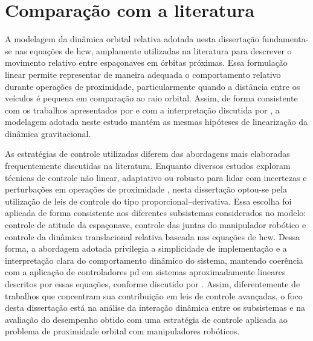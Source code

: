 \section{Comparação com a literatura}
\label{sec_comparacao_literatura}

A modelagem da dinâmica orbital relativa adotada nesta dissertação fundamenta-se nas equações de \gls{hcw}, amplamente utilizadas na literatura para descrever o movimento relativo entre espaçonaves em órbitas próximas.
Essa formulação linear permite representar de maneira adequada o comportamento relativo durante operações de proximidade, particularmente quando a distância entre os veículos é pequena em comparação ao raio orbital.
Assim, de forma consistente com os trabalhos apresentados por \cite{clohessy1960terminal} e com a interpretação discutida por \cite{fehse2003}, a modelagem adotada neste estudo mantém as mesmas hipóteses de linearização da dinâmica gravitacional.

As estratégias de controle utilizadas diferem das abordagens mais elaboradas frequentemente discutidas na literatura. 
Enquanto diversos estudos exploram técnicas de controle não linear, adaptativo ou robusto para lidar com incertezas e perturbações em operações de proximidade \cite{slotine1991applied}, nesta dissertação optou-se pela utilização de leis de controle do tipo proporcional--derivativa.
Essa escolha foi aplicada de forma consistente aos diferentes subsistemas considerados no modelo: controle de atitude da espaçonave, controle das juntas do manipulador robótico e controle da dinâmica translacional relativa baseada nas equações de \gls{hcw}. Dessa forma, a abordagem adotada privilegia a simplicidade de implementação e a interpretação clara do comportamento dinâmico do sistema, mantendo coerência com a aplicação de controladores \gls{pd} em sistemas aproximadamente lineares descritos por essas equações, conforme discutido por \cite{qi2022variable}.
Assim, diferentemente de trabalhos que concentram sua contribuição em leis de controle avançadas, o foco desta dissertação está na análise da interação dinâmica entre os subsistemas e na avaliação do desempenho obtido com uma estratégia de controle aplicada ao problema de proximidade orbital com manipuladores robóticos.

